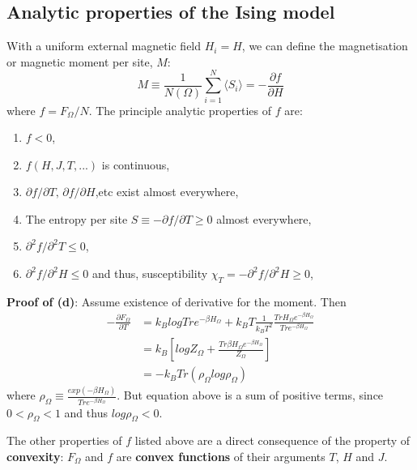 \documentclass[12pt,titlepage]{article}
\numberwithin{equation}{section}
\begin{document}
\subsection{Analytic properties of the Ising model}
With a uniform external magnetic field $H_i=H$, we can define the magnetisation or magnetic moment per site, $M$:
\renewcommand{\labelenumi}{(\alph{enumi})}
\begin{equation}
    M\equiv\frac{1}{N(\Omega)}\sum_{i=1}^N\langle S_i\rangle=-\frac{\partial f}{\partial H}
\end{equation}
where $f=F_{\Omega}/N$. The principle analytic properties of $f$ are:
\begin{enumerate}
    \item $f<0$,
    \item $f(H,J,T,...)$ is continuous,
    \item $\partial f/\partial T\text{, } \partial f/\partial H$,etc exist almost everywhere,
    \item The entropy per site $S\equiv -\partial f/\partial T\geqslant0$ almost everywhere,
    \item $\partial^2 f/\partial^2 T\leqslant0$,
    \item $\partial^2 f/\partial^2 H\leqslant0$ and thus, susceptibility $\chi_T=-\partial^2 f/\partial^2 H\geqslant0$,
\end{enumerate}
\textbf{Proof of (d)}: Assume existence of derivative for the moment. Then
\begin{equation}
\begin{split}
    -\frac{\partial F_{\Omega}}{\partial T} &= k_Blog Tr e^{-\beta H_{\Omega}}+k_BT\frac{1}{k_BT^2}\frac{Tr H_{\Omega}e^{-\beta H_{\Omega}}}{Tr e^{-\beta H_{\Omega}}}\\
    &=k_B[logZ_{\Omega}+\frac{Tr \beta H_{\Omega}e^{-\beta H_{\Omega}}}{Z_{\Omega}}]\\
    &=-k_BTr(\rho_{\Omega}log\rho_{\Omega})
\end{split}
\end{equation}
where $\rho_{\Omega}\equiv \frac{exp(-\beta H_{\Omega})}{Tr e^{-\beta H_{\Omega}}}$. But equation above is a sum of positive terms, since $0<\rho_{\Omega}<1$ and thus $log \rho_{\Omega}<0$.

The other properties of $f$ listed above are a direct consequence of the property of \textbf{convexity}: $F_{\Omega}$ and $f$ are \textbf{convex functions} of their arguments $T$, $H$ and $J$.
\end{document}
